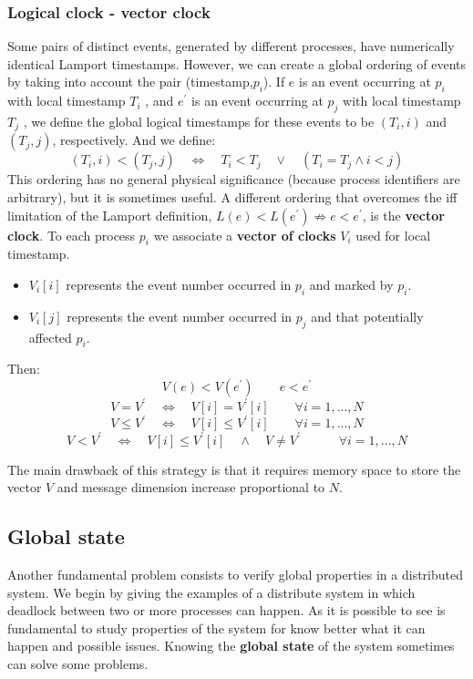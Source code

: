 \documentclass[11pt,a4paper]{article}
\begin{document}
\subsubsection{Logical clock - vector clock}
Some pairs of distinct events, generated by different processes, have numerically identical Lamport timestamps. However, we can create a global ordering of events by taking into account the pair (timestamp,$p_i$). If $e$ is an event occurring at $p_i$ with local timestamp $T_i$ , and $e^\prime$ is an event occurring at $p_j$ with local timestamp $T_j$ , we define the global logical timestamps for these events to be $(T_i,i)$ and $(T_j,j)$, respectively. And we define:
$$ (T_i, i) < (T_j,j) \quad \iff \quad  T_i < T_j \quad \vee \quad (T_i = T_j \wedge i < j)$$
This ordering has no general physical significance (because process identifiers are arbitrary), but it is sometimes useful.
A different ordering that overcomes the iff limitation of the Lamport definition,  $L(e) < L(e^\prime) \not\Rightarrow e < e^\prime$, is the \textbf{vector clock}.
To each process $p_i$ we associate a \textbf{vector of clocks} $V_i$ used for local timestamp.
\begin{itemize}
	\item $V_i[i]$ represents the event number occurred in $p_i$ and marked by $p_i$.
	\item $V_i[j]$ represents the event number occurred in $p_j$ and that potentially affected $p_i$.
\end{itemize}

Then: $$V(e) < V(e^\prime) \qquad  e < e^\prime$$ 
$$V = V^\prime \quad \iff \quad V[i]=V^\prime[i] \qquad \forall i = 1,...,N$$
$$V \leq V^\prime \quad \iff \quad V[i] \leq V^\prime[i] \qquad \forall i = 1,...,N$$
$$V < V^\prime \quad \iff \quad V[i] \leq V^\prime[i] \quad \wedge \quad V \neq V^\prime \quad \qquad \forall i = 1,...,N$$

The main drawback of this strategy is that it requires memory space to store the vector $V$ and message dimension increase proportional to $N$.

\subsection{Global state}
Another fundamental problem consists to verify global properties in a distributed system. We begin by giving the examples of a distribute system in which deadlock between two or more processes can happen.
As it is possible to see is fundamental to study properties of the system for know better what it can happen and possible issues. Knowing the \textbf{global state} of the system sometimes can solve  some problems.
\end{document}

